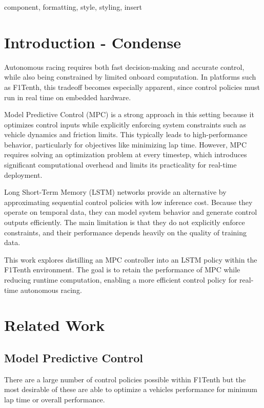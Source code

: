 \documentclass[conference]{IEEEtran}
\begin{document}
\begin{IEEEkeywords}
component, formatting, style, styling, insert
\end{IEEEkeywords}

\section{Introduction - Condense}
Autonomous racing requires both fast decision-making and accurate control, while also being constrained by limited onboard computation. In platforms such as F1Tenth, this tradeoff becomes especially apparent, since control policies must run in real time on embedded hardware.

Model Predictive Control (MPC) is a strong approach in this setting because it optimizes control inputs while explicitly enforcing system constraints such as vehicle dynamics and friction limits. This typically leads to high-performance behavior, particularly for objectives like minimizing lap time. However, MPC requires solving an optimization problem at every timestep, which introduces significant computational overhead and limits its practicality for real-time deployment.

Long Short-Term Memory (LSTM) networks provide an alternative by approximating sequential control policies with low inference cost. Because they operate on temporal data, they can model system behavior and generate control outputs efficiently. The main limitation is that they do not explicitly enforce constraints, and their performance depends heavily on the quality of training data.

This work explores distilling an MPC controller into an LSTM policy within the F1Tenth environment. The goal is to retain the performance of MPC while reducing runtime computation, enabling a more efficient control policy for real-time autonomous racing.

\section{Related Work}

\subsection{Model Predictive Control}

There are a large number of control policies possible within F1Tenth but the most desirable of these are able to optimize a vehicles performance for minimum lap time or overall performance. 
\end{document}
